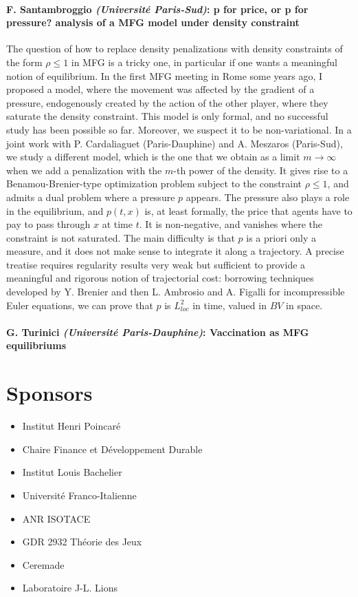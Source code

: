 \documentclass[11pt]{article}
\begin{document}
\paragraph{ F. Santambroggio {\sl (Universit{\'e}  Paris-Sud)}:
   p for price, or p for pressure? analysis of a MFG model under density constraint}   
  The question of how to replace density penalizations with density 
constraints of the form $\rho\leq 1$ in MFG is a tricky one, in 
particular if one wants a meaningful notion of equilibrium. In the first
 MFG meeting in Rome some years ago, I proposed a model, where the 
movement was affected by the gradient of a pressure, endogenously 
created by the action of the other player, where they saturate the 
density constraint. This model is only formal, and no successful study 
has been possible so far. Moreover, we suspect it to be non-variational.
 In a joint work with P. Cardaliaguet (Paris-Dauphine) and A. Meszaros 
(Paris-Sud), we study a different model, which is the one that we obtain
 as a limit $m\to\infty$ when we add a penalization with the $m$-th 
power of the density. It gives rise to a Benamou-Brenier-type 
optimization problem subject to the constraint $\rho\leq 1$, and admits a
 dual problem where a pressure $p$ appears. The pressure also plays a 
role in the equilibrium, and $p(t,x)$ is, at least formally, the price 
that agents have to pay to pass through $x$ at time $t$. It is 
non-negative, and vanishes where the constraint is not saturated. The 
main difficulty is that $p$ is a priori only a measure, and it does not 
make sense to integrate it along a trajectory. A precise treatise 
requires regularity results very weak but sufficient to provide a 
meaningful and rigorous notion of trajectorial cost: borrowing 
techniques developed by Y. Brenier and then L. Ambrosio and A. Figalli 
for incompressible Euler equations, we can prove that $p$ is $L^2_{loc}$
 in time, valued in $BV$ in space. 

\paragraph{ G. Turinici {\sl (Universit{\'e} Paris-Dauphine)}:
   Vaccination as MFG equilibriums  }


\section*{Sponsors}
\begin{itemize}
\item Institut Henri Poincar{\'e}
\item Chaire Finance et D{\'e}veloppement Durable
\item Institut Louis Bachelier
\item Universit{\'e} Franco-Italienne
\item ANR ISOTACE
\item GDR 2932 Th{\'e}orie des Jeux
\item Ceremade
\item Laboratoire J-L. Lions
\end{itemize}
\end{document}

